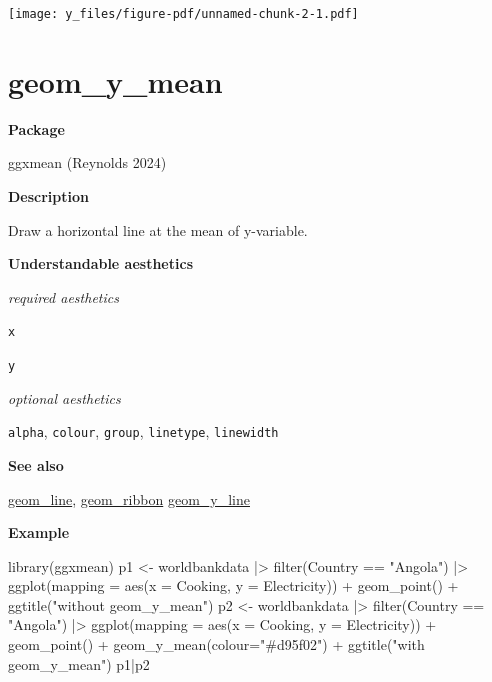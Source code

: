 \documentclass[
  letterpaper,
  DIV=11,
  numbers=noendperiod]{scrreprt}
\newenvironment{Shaded}{\begin{snugshade}}{\end{snugshade}}
\newcommand{\AttributeTok}[1]{\textcolor[rgb]{0.40,0.45,0.13}{#1}}
\newcommand{\FunctionTok}[1]{\textcolor[rgb]{0.28,0.35,0.67}{#1}}
\newcommand{\NormalTok}[1]{\textcolor[rgb]{0.00,0.23,0.31}{#1}}
\newcommand{\OtherTok}[1]{\textcolor[rgb]{0.00,0.23,0.31}{#1}}
\newcommand{\SpecialCharTok}[1]{\textcolor[rgb]{0.37,0.37,0.37}{#1}}
\newcommand{\StringTok}[1]{\textcolor[rgb]{0.13,0.47,0.30}{#1}}
\begin{document}
\texttt{[image: y\_files/figure-pdf/unnamed-chunk-2-1.pdf]}

\section{geom\_y\_mean}\label{y_mean}

\textbf{Package}

ggxmean (Reynolds 2024)

\textbf{Description}

Draw a horizontal line at the mean of y-variable.

\textbf{Understandable aesthetics}

\emph{required aesthetics}

\texttt{x}

\texttt{y}

\emph{optional aesthetics}

\texttt{alpha}, \texttt{colour}, \texttt{group}, \texttt{linetype},
\texttt{linewidth}

\textbf{See also}

\hyperref[line]{geom\_line}, \hyperref[ribbon]{geom\_ribbon}
\hyperref[y_line]{geom\_y\_line}

\textbf{Example}

\begin{Shaded}
\begin{Highlighting}[]
\FunctionTok{library}\NormalTok{(ggxmean)}
\NormalTok{p1 }\OtherTok{\textless{}{-}}\NormalTok{ worldbankdata }\SpecialCharTok{|\textgreater{}} 
  \FunctionTok{filter}\NormalTok{(Country }\SpecialCharTok{==} \StringTok{"Angola"}\NormalTok{) }\SpecialCharTok{|\textgreater{}}
  \FunctionTok{ggplot}\NormalTok{(}\AttributeTok{mapping =} \FunctionTok{aes}\NormalTok{(}\AttributeTok{x =}\NormalTok{ Cooking, }\AttributeTok{y =}\NormalTok{ Electricity)) }\SpecialCharTok{+}
\FunctionTok{geom\_point}\NormalTok{()  }\SpecialCharTok{+} \FunctionTok{ggtitle}\NormalTok{(}\StringTok{"without geom\_y\_mean"}\NormalTok{)}
\NormalTok{p2 }\OtherTok{\textless{}{-}}\NormalTok{ worldbankdata }\SpecialCharTok{|\textgreater{}} 
  \FunctionTok{filter}\NormalTok{(Country }\SpecialCharTok{==} \StringTok{"Angola"}\NormalTok{) }\SpecialCharTok{|\textgreater{}}
  \FunctionTok{ggplot}\NormalTok{(}\AttributeTok{mapping =} \FunctionTok{aes}\NormalTok{(}\AttributeTok{x =}\NormalTok{ Cooking, }\AttributeTok{y =}\NormalTok{ Electricity)) }\SpecialCharTok{+}
\FunctionTok{geom\_point}\NormalTok{() }\SpecialCharTok{+} \FunctionTok{geom\_y\_mean}\NormalTok{(}\AttributeTok{colour=}\StringTok{"\#d95f02"}\NormalTok{) }\SpecialCharTok{+} 
  \FunctionTok{ggtitle}\NormalTok{(}\StringTok{"with geom\_y\_mean"}\NormalTok{)}
\NormalTok{p1}\SpecialCharTok{|}\NormalTok{p2}
\end{Highlighting}
\end{Shaded}
\end{document}

